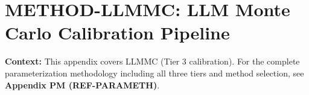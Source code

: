 
\chapter{METHOD-LLMMC: LLM Monte Carlo Calibration Pipeline}
\label{app:iii-llmmc}


\begin{abstract}
How can we convert LLM-generated effect estimates into reliable, calibrated parameters
for intervention design? This appendix presents the LLMMC (LLM Monte Carlo) pipeline:
a complete methodology for (1) eliciting effect estimates from LLMs, (2) calibrating
them against Tier-1/2 empirical anchors, (3) mapping to a unified $\theta \in [0,1]$ scale,
(4) computing R-Scores with Monte Carlo uncertainty propagation, and (5) generating
GO/PILOT/NO-GO decisions. The pipeline is empirically validated with 5/5 deployment
checks passed for both d/SMD and percentage-point scales.
\end{abstract}

\textbf{Context:} This appendix covers LLMMC (Tier 3 calibration). For the complete parameterization methodology including all three tiers and method selection, see \textbf{Appendix PM (REF-PARAMETH)}.


